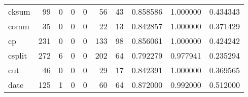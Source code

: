 \begin{longtable}{lrrrrrrrrr}
cksum     &                                        99 &                                                  0 &                                                  0 &                                                  0 &                                                 56 &                                                 43 &                                           0.858586 &                               1.000000 &                             0.434343 \\
comm      &                                        35 &                                                  0 &                                                  0 &                                                  0 &                                                 22 &                                                 13 &                                           0.842857 &                               1.000000 &                             0.371429 \\
cp        &                                       231 &                                                  0 &                                                  0 &                                                  0 &                                                133 &                                                 98 &                                           0.856061 &                               1.000000 &                             0.424242 \\
csplit    &                                       272 &                                                  6 &                                                  0 &                                                  0 &                                                202 &                                                 64 &                                           0.792279 &                               0.977941 &                             0.235294 \\
cut       &                                        46 &                                                  0 &                                                  0 &                                                  0 &                                                 29 &                                                 17 &                                           0.842391 &                               1.000000 &                             0.369565 \\
date      &                                       125 &                                                  1 &                                                  0 &                                                  0 &                                                 60 &                                                 64 &                                           0.872000 &                               0.992000 &                             0.512000 \\

\end{longtable}

